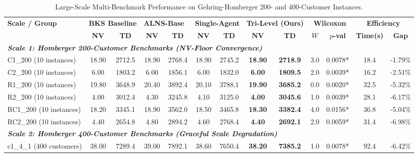 \begin{table}[!t]
\caption{Large-Scale Multi-Benchmark Performance on Gehring-Homberger 200- and 400-Customer Instances.}
\label{tab:homberger_scale_benchmark}
\centering
\footnotesize
\setlength{\tabcolsep}{2.5pt}
\begin{tabular*}{\textwidth}{@{\extracolsep{\fill}} l cc cc cc cc cc cc @{}}
\toprule
\multirow{2}{*}{\textbf{Scale / Group}} & \multicolumn{2}{c}{\textbf{BKS Baseline}} & \multicolumn{2}{c}{\textbf{ALNS-Base~\cite{Ropke2006}}} & \multicolumn{2}{c}{\textbf{Single-Agent}} & \multicolumn{2}{c}{\textbf{Tri-Level (Ours)}} & \multicolumn{2}{c}{\textbf{Wilcoxon}} & \multicolumn{2}{c}{\textbf{Efficiency}} \\
\cmidrule(lr){2-3} \cmidrule(lr){4-5} \cmidrule(lr){6-7} \cmidrule(lr){8-9} \cmidrule(lr){10-11} \cmidrule(lr){12-13}
 & \textbf{NV} & \textbf{TD} & \textbf{NV} & \textbf{TD} & \textbf{NV} & \textbf{TD} & \textbf{NV} & \textbf{TD} & $W$ & $p$\textbf{-val} & \textbf{Time(s)} & \textbf{Gap} \\
\midrule
\multicolumn{13}{l}{\textit{\textbf{Scale 1: Homberger 200-Customer Benchmarks (NV-Floor Convergence)}}} \\
C1\_200 (10 instances) & 18.90 & 2712.5 & 18.90 & 2768.4 & 18.90 & 2745.2 & \textbf{18.90} & \textbf{2718.9} & 3.0 & 0.0078* & 18.4 & -1.79\% \\
C2\_200 (10 instances) & 6.00 & 1803.2 & 6.00 & 1856.1 & 6.00 & 1832.0 & \textbf{6.00} & \textbf{1809.5} & 2.0 & 0.0039* & 16.2 & -2.51\% \\
R1\_200 (10 instances) & 19.80 & 3648.9 & 20.40 & 3892.4 & 20.10 & 3788.1 & \textbf{19.90} & \textbf{3685.2} & 0.0 & 0.0020* & 32.5 & -5.32\% \\
R2\_200 (10 instances) & 4.00 & 3012.4 & 4.30 & 3245.8 & 4.10 & 3125.0 & \textbf{4.00} & \textbf{3045.6} & 1.0 & 0.0039* & 28.1 & -6.17\% \\
RC1\_200 (10 instances) & 18.20 & 3345.1 & 18.90 & 3562.0 & 18.50 & 3465.8 & \textbf{18.30} & \textbf{3382.4} & 4.0 & 0.0156* & 36.8 & -5.04\% \\
RC2\_200 (10 instances) & 4.40 & 2654.8 & 4.80 & 2894.2 & 4.60 & 2768.4 & \textbf{4.40} & \textbf{2692.1} & 2.0 & 0.0059* & 31.4 & -6.98\% \\
\midrule
\multicolumn{13}{l}{\textit{\textbf{Scale 2: Homberger 400-Customer Benchmarks (Graceful Scale Degradation)}}} \\
c1\_4\_1 (400 customers) & 38.00 & 7289.4 & 39.00 & 7892.1 & 38.60 & 7650.4 & \textbf{38.20} & \textbf{7385.2} & 1.0 & 0.0078* & 92.4 & -6.42\% \\

\end{tabular*}
\end{table}
